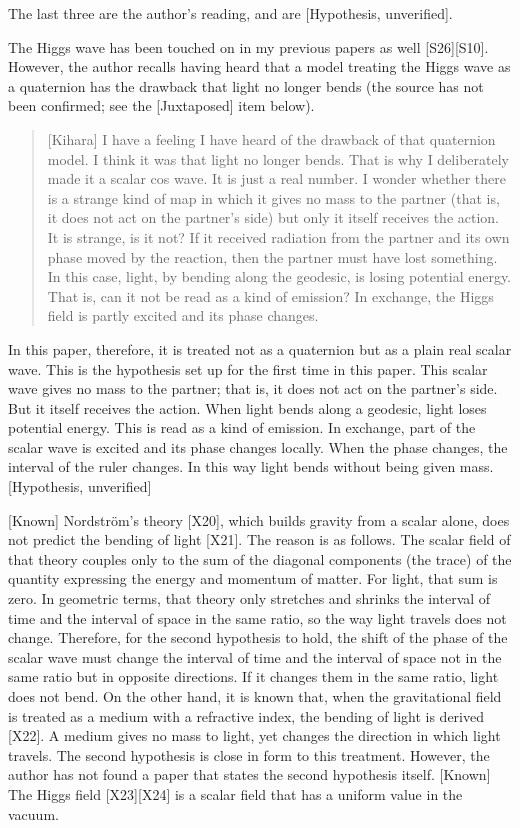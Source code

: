 \documentclass[
  a4paper,
]{article}
\begin{document}
The last three are the author's reading, and are {[}Hypothesis,
unverified{]}.

The Higgs wave has been touched on in my previous papers as well
{[}S26{]}{[}S10{]}. However, the author recalls having heard that a
model treating the Higgs wave as a quaternion has the drawback that
light no longer bends (the source has not been confirmed; see the
{[}Juxtaposed{]} item below).

\begin{quote}
{[}Kihara{]} I have a feeling I have heard of the drawback of that
quaternion model. I think it was that light no longer bends. That is why
I deliberately made it a scalar cos wave. It is just a real number. I
wonder whether there is a strange kind of map in which it gives no mass
to the partner (that is, it does not act on the partner's side) but only
it itself receives the action. It is strange, is it not? If it received
radiation from the partner and its own phase moved by the reaction, then
the partner must have lost something. In this case, light, by bending
along the geodesic, is losing potential energy. That is, can it not be
read as a kind of emission? In exchange, the Higgs field is partly
excited and its phase changes.
\end{quote}

In this paper, therefore, it is treated not as a quaternion but as a
plain real scalar wave. This is the hypothesis set up for the first time
in this paper. This scalar wave gives no mass to the partner; that is,
it does not act on the partner's side. But it itself receives the
action. When light bends along a geodesic, light loses potential energy.
This is read as a kind of emission. In exchange, part of the scalar wave
is excited and its phase changes locally. When the phase changes, the
interval of the ruler changes. In this way light bends without being
given mass. {[}Hypothesis, unverified{]}

{[}Known{]} Nordström's theory {[}X20{]}, which builds gravity from a
scalar alone, does not predict the bending of light {[}X21{]}. The
reason is as follows. The scalar field of that theory couples only to
the sum of the diagonal components (the trace) of the quantity
expressing the energy and momentum of matter. For light, that sum is
zero. In geometric terms, that theory only stretches and shrinks the
interval of time and the interval of space in the same ratio, so the way
light travels does not change. Therefore, for the second hypothesis to
hold, the shift of the phase of the scalar wave must change the interval
of time and the interval of space not in the same ratio but in opposite
directions. If it changes them in the same ratio, light does not bend.
On the other hand, it is known that, when the gravitational field is
treated as a medium with a refractive index, the bending of light is
derived {[}X22{]}. A medium gives no mass to light, yet changes the
direction in which light travels. The second hypothesis is close in form
to this treatment. However, the author has not found a paper that states
the second hypothesis itself. {[}Known{]} The Higgs field
{[}X23{]}{[}X24{]} is a scalar field that has a uniform value in the
vacuum.
\end{document}
